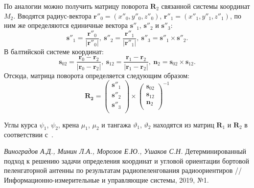 \documentclass[a4paper,12pt]{article}
\begin{document}
По аналогии можно получить матрицу поворота $\mathbf{R}_2$ связанной системы
координат $M_2$. Вводятся радиус-вектора $\mathbf{r}''_0 = \left(x''_0, y''_0, z''_0\right)$,
$\mathbf{r}''_1 = \left(x''_1, y''_1, z''_1\right)$, по ним же определяются единичные вектора
$\mathbf{s}''_1$, $\mathbf{s}''_2$ и $\mathbf{s}''_3$:
\begin{equation}
    \mathbf{s}''_1 = \frac{\mathbf{r}''_0}{|\mathbf{r}''_0|},\
    \mathbf{s}''_2 = \frac{\mathbf{r}''_1}{|\mathbf{r}''_1|},\
    \mathbf{s}''_3 = \mathbf{s}''_1 \times \mathbf{s}''_2.
\end{equation}
В балтийской системе координат:
\begin{equation}
    \mathbf{s}_{02} = \frac{\mathbf{r}_0 - \mathbf{r}_2}{|\mathbf{r}_0 - \mathbf{r}_2|},\
    \mathbf{s}_{12} = \frac{\mathbf{r}_1 - \mathbf{r}_2}{|\mathbf{r}_1 - \mathbf{r}_2|},\
    \mathbf{n}_2 = \mathbf{s}_{02} \times \mathbf{s}_{12}.
\end{equation}
Отсюда, матрица поворота определяется следующим образом:
\begin{equation}
    \mathbf{R_2} =
    \left(
    \begin{matrix}
        \mathbf{s}''_1 \\
        \mathbf{s}''_2 \\
        \mathbf{s}''_3 \\
    \end{matrix}
    \right) \times
    \left(
    \begin{matrix}
        \mathbf{s}_{02} \\
        \mathbf{s}_{12} \\
        \mathbf{n}_2 \\
    \end{matrix}
    \right)^{-1}
\end{equation}

Углы курса $\psi_1$, $\psi_2$, крена $\mu_1$, $\mu_2$ и тангажа $\vartheta_1$, $\vartheta_2$ находятся
из матриц $\mathbf{R}_1$ и $\mathbf{R}_2$ в соответствии с~\cite{antennas}.


\newpage
\begin{thebibliography}{9}
    \textit{Виноградов А.Д., Минин Л.А., Морозов Е.Ю., Ушаков С.Н.}
    Детерминированный подход к решению задачи определения координат и угловой
    ориентации бортовой пеленгаторной антенны по результатам радиопеленгования
    радиоориентиров // Информационно-измерительные и управляющие системы, 2019, №1.
\end{thebibliography}
\end{document}
